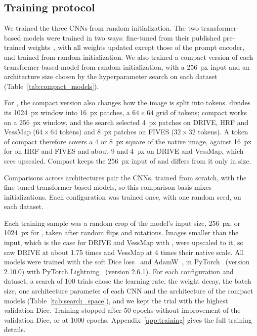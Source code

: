 \subsection{Training protocol}
\label{subsec:method_training}

We trained the three CNNs from random initialization. The two transformer-based models were trained in two ways: fine-tuned from their published pre-trained weights~\cite{ma2024segment, ma2024efficient}, with all weights updated except those of the prompt encoder, and trained from random initialization. We also trained a compact version of each transformer-based model from random initialization, with a 256~px input and an architecture size chosen by the hyperparameter search on each dataset (Table~\ref{tab:compact_models}).

For \medsam{}, the compact version also changes how the image is split into tokens. \medsam{} divides its 1024~px window into 16~px patches, a $64 \times 64$ grid of tokens; compact \medsam{} works on a 256~px window, and the search selected 4~px patches on DRIVE, HRF and VessMap ($64 \times 64$ tokens) and 8~px patches on FIVES ($32 \times 32$ tokens). A token of compact \medsam{} therefore covers a 4 or 8~px square of the native image, against 16~px for \medsam{} on HRF and FIVES and about 9 and 4~px on DRIVE and VessMap, which \medsam{} sees upscaled. Compact \litemedsam{} keeps the 256~px input of \litemedsam{} and differs from it only in size.

Comparisons across architectures pair the CNNs, trained from scratch, with the fine-tuned transformer-based models, so this comparison basis mixes initializations. Each configuration was trained once, with one random seed, on each dataset.

Each training sample was a random crop of the model's input size, 256~px, or 1024~px for \medsam{}, taken after random flips and rotations. Images smaller than the input, which is the case for DRIVE and VessMap with \medsam{}, were upscaled to it, so \medsam{} saw DRIVE at about 1.75 times and VessMap at 4 times their native scale. All models were trained with the soft Dice loss~\cite{milletari2016vnet} and AdamW~\cite{loshchilov2019decoupled}, in PyTorch~\cite{paszke2019pytorch} (version 2.10.0) with PyTorch Lightning~\cite{falcon2026lightning} (version 2.6.1). For each configuration and dataset, a search of 100 trials chose the learning rate, the weight decay, the batch size, one architecture parameter of each CNN and the architecture of the compact models (Table~\ref{tab:search_space}), and we kept the trial with the highest validation Dice. Training stopped after 50 epochs without improvement of the validation Dice, or at 1000 epochs. Appendix~\ref{app:training} gives the full training details.


